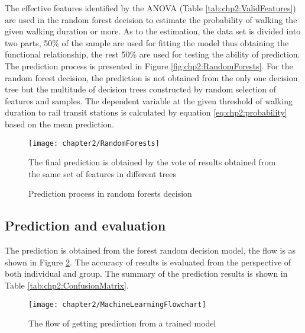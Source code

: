 The effective features identified by the ANOVA (Table \ref{tab:chp2:ValidFeatures}) are used in the random forest decision to estimate the probability of walking the given walking duration or more. As to the estimation, the data set is divided into two parts, 50\% of the sample are used for fitting the model thus obtaining the functional relationship, the rest 50\% are used for testing the ability of prediction. The prediction process is presented in Figure \ref{fig:chp2:RandomForests}. For the random forest decision, the prediction is not obtained from the only one decision tree but the multitude of decision trees constructed by random selection of features and samples. The dependent variable at the given threshold of walking duration to rail transit stations is calculated by equation \ref{eq:chp2:probability} based on the mean prediction.

\begin{figure}[htbp]
	\centering
	\texttt{[image: chapter2/RandomForests]}
	\caption{Prediction process in random forests decision}
	\label{fig:chp2:RandomForests}
	\begin{description}
		\small
		\label{note:fig:chp2:RandomForests}
		\item[Note:] The final prediction is obtained by the vote of results obtained from the same set of features in different trees
	\end{description}
\end{figure}

%
\subsection{Prediction and evaluation}
The prediction is obtained from the forest random decision model, the flow is as shown in Figure \ref{fig:chp2:MachineLearningFlowchart}. The accuracy of results is evaluated from the perspective of both individual and group. The summary of the prediction results is shown in Table \ref{tab:chp2:ConfusionMatrix}.

\begin{figure}[htbp]
	\centering
	\texttt{[image: chapter2/MachineLearningFlowchart]}
	\caption{The flow of getting prediction from a trained model}
	\label{fig:chp2:MachineLearningFlowchart}
\end{figure}

